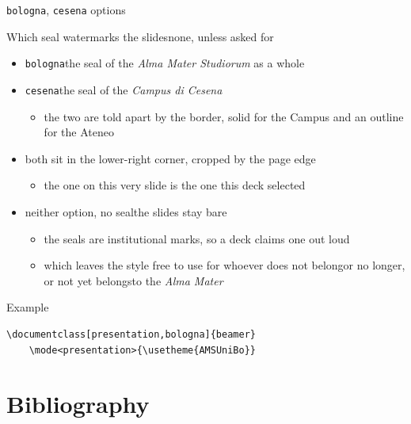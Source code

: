 \documentclass[presentation,bologna,apice]{beamer}\mode<presentation>{\usetheme{AMSUniBo}}
\begin{document}
\begin{frame}[c,fragile]{\texttt{bologna}, \texttt{cesena} options}
%
\begin{alertblock}{Which seal watermarks the slides\textemdash{}none, unless asked for}
\begin{itemize}
	\item \texttt{bologna}\textemdash{}the seal of the \emph{Alma Mater Studiorum} as a whole
	\item \texttt{cesena}\textemdash{}the seal of the \emph{Campus di Cesena}
	\begin{itemize}
		\item the two are told apart by the border, solid for the Campus and an outline for the Ateneo
	\end{itemize}
	\item both sit in the lower-right corner, cropped by the page edge
	\begin{itemize}
		\item the one on this very slide is the one this deck selected
	\end{itemize}
	\item \alert{neither option, no seal}\textemdash{}the slides stay bare
	\begin{itemize}
		\item the seals are institutional marks, so a deck claims one out loud
		\item which leaves the style free to use for whoever does not belong\textemdash{}or no longer, or not yet belongs\textemdash{}to the \emph{Alma Mater}
	\end{itemize}
\end{itemize}
\end{alertblock}
%
\begin{exampleblock}{Example}
{\scriptsize\begin{verbatim}
\documentclass[presentation,bologna]{beamer}
    \mode<presentation>{\usetheme{AMSUniBo}}
\end{verbatim}} %
\end{exampleblock}
%
\end{frame}

\section{Bibliography}
\end{document}
